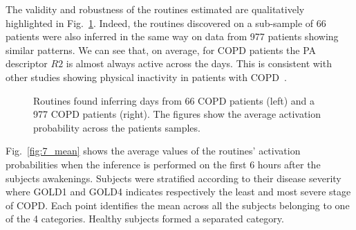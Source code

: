 %
%
The  validity and robustness of the routines estimated are qualitatively highlighted in Fig.~\ref{fig:6}. Indeed, the routines discovered on a sub-sample of 66 patients were also inferred in the same way on data from 977 patients showing similar patterns. We can see that, on average, for COPD patients the PA descriptor $R2$ is almost always active across the days. This is consistent with other studies showing physical inactivity in patients with COPD~\cite{Troosters_2010}.
\begin{figure}[ht]
  \centering
  \mbox{}
  \mbox{}
    \caption{Routines found inferring days from 66 COPD patients (left) and a 977 COPD patients (right). The figures show the average activation probability across the patients samples.}\label{fig:6}
\end{figure}
%
%
Fig.~\ref{fig:7_mean} shows the average values of the routines' activation probabilities when the inference is performed on the first 6 hours after the subjects awakenings. Subjects were stratified according to their disease severity where GOLD1 and GOLD4 indicates respectively the least and most severe stage of COPD. Each point identifies the mean across all the subjects belonging to one of the 4 categories. Healthy subjects formed a separated category. 
